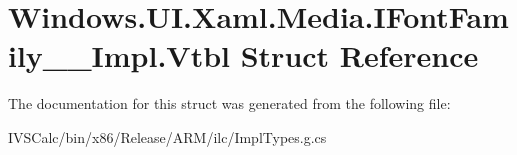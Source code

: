 \hypertarget{struct_windows_1_1_u_i_1_1_xaml_1_1_media_1_1_i_font_family_____impl_1_1_vtbl}{}\section{Windows.\+U\+I.\+Xaml.\+Media.\+I\+Font\+Family\+\_\+\+\_\+\+Impl.\+Vtbl Struct Reference}
\label{struct_windows_1_1_u_i_1_1_xaml_1_1_media_1_1_i_font_family_____impl_1_1_vtbl}


The documentation for this struct was generated from the following file\+:\begin{DoxyCompactItemize}
\item 
I\+V\+S\+Calc/bin/x86/\+Release/\+A\+R\+M/ilc/Impl\+Types.\+g.\+cs\end{DoxyCompactItemize}
